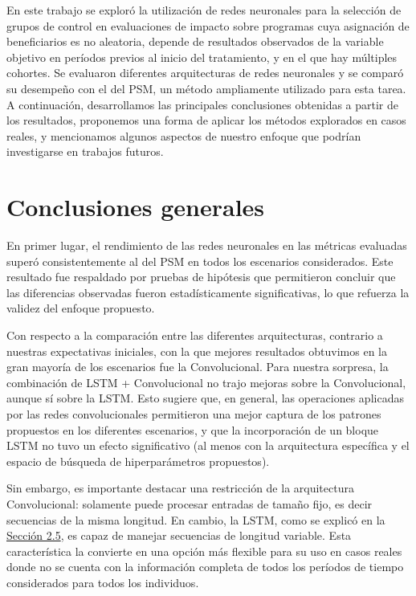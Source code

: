 \documentclass[../main.tex]{subfiles}
\begin{document}
En este trabajo se exploró la utilización de redes neuronales para la selección de grupos
de control en evaluaciones de impacto sobre programas cuya asignación de beneficiarios es
no aleatoria, depende de resultados observados de la variable objetivo en períodos previos
al inicio del tratamiento, y en el que hay múltiples cohortes. Se evaluaron diferentes
arquitecturas de redes neuronales y se comparó su desempeño con el del PSM, un método
ampliamente utilizado para esta tarea. A continuación, desarrollamos las principales
conclusiones obtenidas a partir de los resultados, proponemos una forma de aplicar los
métodos explorados en casos reales, y mencionamos algunos aspectos de nuestro enfoque que
podrían investigarse en trabajos futuros.

\section{Conclusiones generales}
En primer lugar, el rendimiento de las redes neuronales en las métricas evaluadas superó
consistentemente al del PSM en todos los escenarios considerados. Este resultado fue
respaldado por pruebas de hipótesis que permitieron concluir que las diferencias
observadas fueron estadísticamente significativas, lo que refuerza la validez del enfoque
propuesto.

Con respecto a la comparación entre las diferentes arquitecturas, contrario a nuestras
expectativas iniciales, con la que mejores resultados obtuvimos en la gran mayoría de los
escenarios fue la Convolucional. Para nuestra sorpresa, la combinación de LSTM +
Convolucional no trajo mejoras sobre la Convolucional, aunque sí sobre la LSTM. Esto
sugiere que, en general, las operaciones aplicadas por las redes convolucionales
permitieron una mejor captura de los patrones propuestos en los diferentes escenarios, y
que la incorporación de un bloque LSTM no tuvo un efecto significativo (al menos con la
arquitectura específica y el espacio de búsqueda de hiperparámetros propuestos).

Sin embargo, es importante destacar una restricción de la arquitectura Convolucional:
solamente puede procesar entradas de tamaño fijo, es decir secuencias de la misma
longitud. En cambio, la LSTM, como se explicó en la \hyperref[sec:recurrentes]{Sección
2.5}, es capaz de manejar secuencias de longitud variable. Esta característica la
convierte en una opción más flexible para su uso en casos reales donde no se cuenta con la
información completa de todos los períodos de tiempo considerados para todos los
individuos.
\end{document}
